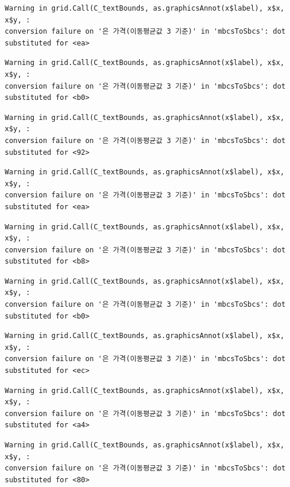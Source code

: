 \documentclass[
  letterpaper,
  DIV=11,
  numbers=noendperiod]{scrreprt}
\begin{document}
\begin{verbatim}
Warning in grid.Call(C_textBounds, as.graphicsAnnot(x$label), x$x, x$y, :
conversion failure on '은 가격(이동평균값 3 기준)' in 'mbcsToSbcs': dot
substituted for <ea>
\end{verbatim}

\begin{verbatim}
Warning in grid.Call(C_textBounds, as.graphicsAnnot(x$label), x$x, x$y, :
conversion failure on '은 가격(이동평균값 3 기준)' in 'mbcsToSbcs': dot
substituted for <b0>
\end{verbatim}

\begin{verbatim}
Warning in grid.Call(C_textBounds, as.graphicsAnnot(x$label), x$x, x$y, :
conversion failure on '은 가격(이동평균값 3 기준)' in 'mbcsToSbcs': dot
substituted for <92>
\end{verbatim}

\begin{verbatim}
Warning in grid.Call(C_textBounds, as.graphicsAnnot(x$label), x$x, x$y, :
conversion failure on '은 가격(이동평균값 3 기준)' in 'mbcsToSbcs': dot
substituted for <ea>
\end{verbatim}

\begin{verbatim}
Warning in grid.Call(C_textBounds, as.graphicsAnnot(x$label), x$x, x$y, :
conversion failure on '은 가격(이동평균값 3 기준)' in 'mbcsToSbcs': dot
substituted for <b8>
\end{verbatim}

\begin{verbatim}
Warning in grid.Call(C_textBounds, as.graphicsAnnot(x$label), x$x, x$y, :
conversion failure on '은 가격(이동평균값 3 기준)' in 'mbcsToSbcs': dot
substituted for <b0>
\end{verbatim}

\begin{verbatim}
Warning in grid.Call(C_textBounds, as.graphicsAnnot(x$label), x$x, x$y, :
conversion failure on '은 가격(이동평균값 3 기준)' in 'mbcsToSbcs': dot
substituted for <ec>
\end{verbatim}

\begin{verbatim}
Warning in grid.Call(C_textBounds, as.graphicsAnnot(x$label), x$x, x$y, :
conversion failure on '은 가격(이동평균값 3 기준)' in 'mbcsToSbcs': dot
substituted for <a4>
\end{verbatim}

\begin{verbatim}
Warning in grid.Call(C_textBounds, as.graphicsAnnot(x$label), x$x, x$y, :
conversion failure on '은 가격(이동평균값 3 기준)' in 'mbcsToSbcs': dot
substituted for <80>
\end{verbatim}
\end{document}
